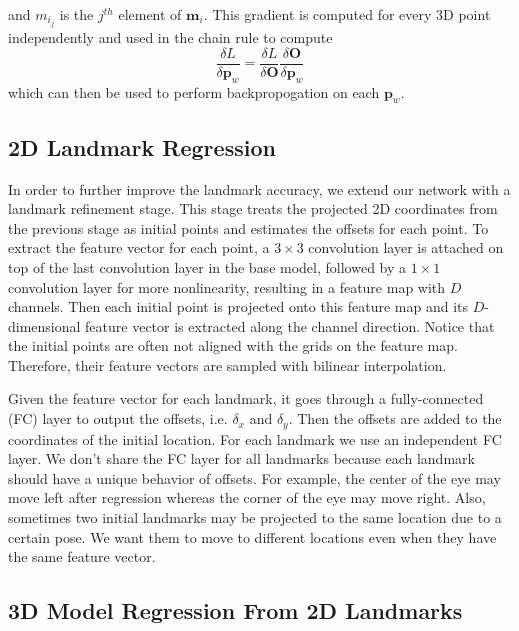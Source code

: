 \documentclass[10pt,twocolumn,letterpaper]{article}
\begin{document}
and $m_{i_j}$ is the $j^{th}$ element of $\mathbf{m}_i$. This gradient is computed for every 3D point independently and used in the chain rule to compute
\begin{equation}
\frac{\delta L}{\delta\mathbf{p}_w}=\frac{\delta L}{\delta \mathbf{O}}\frac{\delta \mathbf{O}}{\delta \mathbf{p}_w}
\end{equation}
which can then be used to perform backpropogation on each $\mathbf{p}_w$.

\subsection{2D Landmark Regression}
In order to further improve the landmark accuracy, we extend our network with a landmark refinement stage. This stage treats the projected 2D coordinates from the previous stage as initial points and estimates the offsets for each point. To extract the feature vector for each point, a $3\times 3$ convolution layer is attached on top of the last convolution layer in the base model, followed by a $1\times 1$ convolution layer for more nonlinearity, resulting in a feature map with $D$ channels. Then each initial point is projected onto this feature map and its $D$-dimensional feature vector is extracted along the channel direction. Notice that the initial points are often not aligned with the grids on the feature map. Therefore, their feature vectors are sampled with bilinear interpolation.

Given the feature vector for each landmark, it goes through a fully-connected (FC) layer to output the offsets, i.e. $\delta_x$ and $\delta_y$. Then the offsets are added to the coordinates of the initial location. For each landmark we use an independent FC layer. We don't share the FC layer for all landmarks because each landmark should have a unique behavior of offsets. For example, the center of the eye may move left after regression whereas the corner of the eye may move right. Also, sometimes two initial landmarks may be projected to the same location due to a certain pose. We want them to move to different locations even when they have the same feature vector.

\subsection{3D Model Regression From 2D Landmarks}
\end{document}

